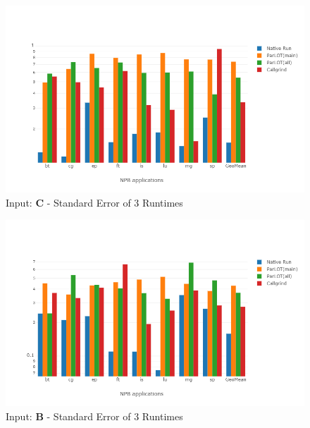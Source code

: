 \begin{figure}[!t]
\centering
\includegraphics[width=6in]{figs.comet/comet_chartAvg_serr_C_p3_5.png}
\caption{ Input: \textbf{C}  - Standard Error of 3 Runtimes
}
\label{comet_chartAvg_serr_C_p3_5}
\end{figure}



\begin{figure}[!t]
\centering
\includegraphics[width=6in]{figs.comet/comet_chartAvg_serr_B_p3_5.png}
\caption{ Input: \textbf{B}  - Standard Error of 3 Runtimes
}
\label{comet_chartAvg_serr_B_p3_5}
\end{figure}



